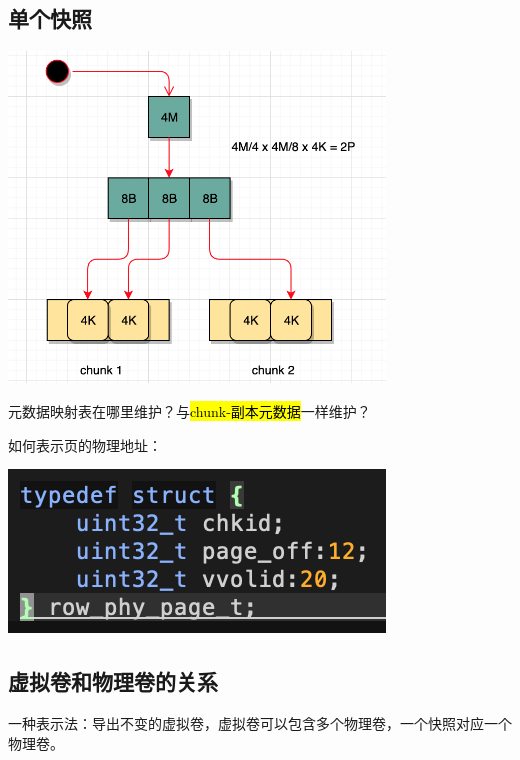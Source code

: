 \subsection{单个快照}

\begin{center}
\includegraphics[width=10cm]{../imgs/snapshot/snapshot-head.png}
\end{center}

元数据映射表在哪里维护？与\hl{chunk-副本元数据}一样维护？


如何表示页的物理地址：
\begin{center}
\includegraphics[width=10cm]{../imgs/snapshot/row-phy-page.png}
\end{center}

\subsection{虚拟卷和物理卷的关系}

一种表示法：导出不变的虚拟卷，虚拟卷可以包含多个物理卷，一个快照对应一个物理卷。

